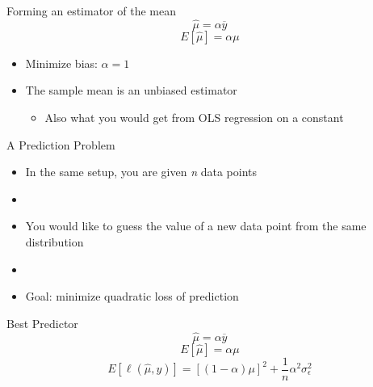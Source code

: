 \documentclass{beamer}
\begin{document}
\begin{frame}{Forming an estimator of the mean}
	$$\hat{\mu}=\alpha\overline{y}$$
	$$E[\hat{\mu}]=\alpha\mu$$
	\begin{itemize}
		\item Minimize bias: $\alpha=1$
		\item The sample mean is an unbiased estimator
		\begin{itemize}
			\item Also what you would get from OLS regression on a constant
		\end{itemize}		
	\end{itemize}
\end{frame}

\begin{frame}{A Prediction Problem}
	\begin{itemize}
		\item In the same setup, you are given \textit{n} data points
		\item[]
		\item You would like to guess the value of a new data point from the same distribution
		\item[]
		\item Goal: minimize quadratic loss of prediction
	\end{itemize}
\end{frame}

\begin{frame}{Best Predictor}
	$$\hat{\mu}=\alpha\overline{y}$$
	$$E[\hat{\mu}]=\alpha\mu$$
	$$E[\ell(\hat{\mu},y)]=[(1-\alpha)\mu]^2+\frac{1}{n}\alpha^2\sigma_\epsilon^2$$
\end{frame}
\end{document}

